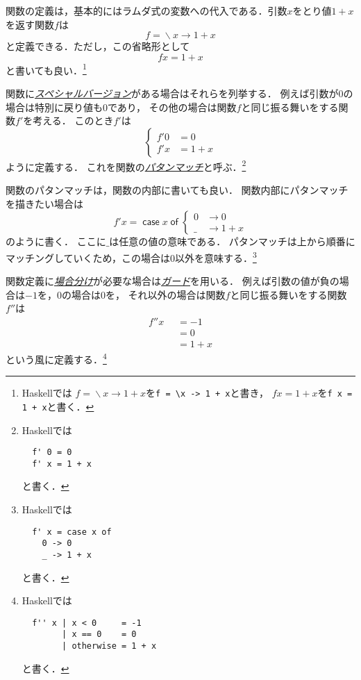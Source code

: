 \documentclass[a5paper,draft]{jsbook}
\newcommand{\programminglanguage}[1]{\textsf{#1}}
\newcommand{\haskell}{\programminglanguage{Haskell}}
\newcommand{\keyword}[1]{{\underline{\emph{#1}}}}
\newcommand{\code}[1]{\texttt{#1}}
\newcommand{\mathGuard}[1]{\mathop{\mid_{#1}}}
\newcommand{\mathUnaryOperator}[1]{\operatorname{#1}}
\newcommand{\mathLambda}{\mathUnaryOperator{\backslash}}
\newcommand{\mathLambdaArrow}{\rightarrow}
\newcommand{\mathKeyword}[1]{\operatorname{\textsf{#1}}}
\newcommand{\mathOtherwise}{\mathKeyword{otherwise}}
\newcommand{\mathCaseCase}{\mathKeyword{case}}
\newcommand{\mathCaseOf}{\mathKeyword{of}}
\newcommand{\mathCase}[2]{\mathCaseCase#1\mathCaseOf#2}
\newcommand{\mathLambdaExpression}[2]{\mathLambda#1\mathLambdaArrow#2}
\begin{document}
関数の定義は，基本的にはラムダ式の変数への代入である．引数$x$をとり値$1+x$を返す関数$f$は
\begin{equation}
f=\mathLambdaExpression{x}{1+x}
\end{equation}
と定義できる．ただし，この省略形として
\begin{equation}
fx=1+x
\end{equation}
と書いても良い．\footnote{\haskell では
$f=\mathLambdaExpression{x}{1+x}$を\code{f = \textbackslash x -> 1 + x}と書き，
$fx=1+x$を\code{f x = 1 + x}と書く．}

関数に\keyword{スペシャルバージョン}がある場合はそれらを列挙する．
例えば引数が$0$の場合は特別に戻り値も$0$であり，
その他の場合は関数$f$と同じ振る舞いをする関数$f'$を考える．
このとき$f'$は
\begin{equation}
\left\{
\begin{split}
f'0&=0\\
f'x&=1+x
\end{split}
\right.
\end{equation}
ように定義する．
これを関数の\keyword{パタンマッチ}と呼ぶ．\footnote{\haskell では
\begin{verbatim}
  f' 0 = 0
  f' x = 1 + x
\end{verbatim}
と書く．}

関数のパタンマッチは，関数の内部に書いても良い．
関数内部にパタンマッチを描きたい場合は
\begin{equation}
f'x=\mathCase{x}{\left\{
\begin{split}
0&\rightarrow0\\
\_&\rightarrow1+x
\end{split}
\right.}
\end{equation}
のように書く．
ここに$\_$は任意の値の意味である．
パタンマッチは上から順番にマッチングしていくため，この場合は$0$以外を意味する．\footnote{\haskell では
\begin{verbatim}
  f' x = case x of
    0 -> 0
    _ -> 1 + x
\end{verbatim}
と書く．}

関数定義に\keyword{場合分け}が必要な場合は\keyword{ガード}を用いる．
例えば引数の値が負の場合は$-1$を，$0$の場合は$0$を，
それ以外の場合は関数$f$と同じ振る舞いをする関数$f''$は
\begin{equation}
\begin{split}
f''x&\mathGuard{x<0}=-1\\
&\mathGuard{x\equiv 0}=0\\
&\mathGuard{\mathOtherwise}=1+x
\end{split}
\end{equation}
という風に定義する．\footnote{\haskell では
\begin{verbatim}
  f'' x | x < 0     = -1
        | x == 0    = 0
        | otherwise = 1 + x
\end{verbatim}
と書く．}
\end{document}
